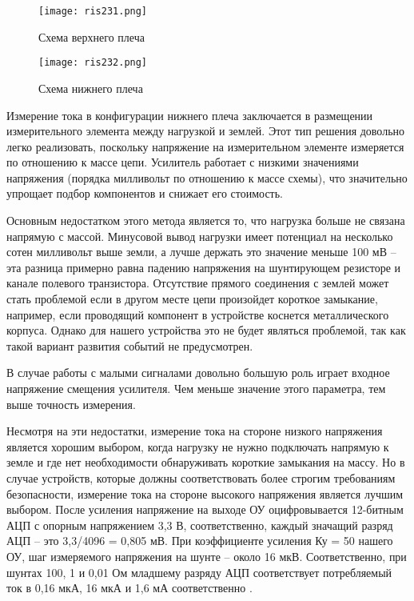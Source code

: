 \begin{figure}[H]
  \centering
  \texttt{[image: ris231.png]}
  \caption{Схема верхнего плеча}
  \label{ris:231}
\end{figure}

\begin{figure}[H]
  \centering
  \texttt{[image: ris232.png]}
  \caption{Схема нижнего плеча}
  \label{ris:232}
\end{figure}

Измерение тока в конфигурации нижнего плеча заключается в размещении измерительного 
элемента между нагрузкой и землей. Этот тип решения довольно легко реализовать, поскольку 
напряжение на измерительном элементе измеряется по отношению к массе цепи. Усилитель 
работает с низкими значениями напряжения (порядка милливольт по отношению к массе схемы), 
что значительно упрощает подбор компонентов и снижает его стоимость.

Основным недостатком этого метода является то, что нагрузка больше не связана напрямую с массой.
 Минусовой вывод нагрузки имеет потенциал на несколько сотен милливольт выше земли, 
 а лучше держать это значение меньше 100 мВ -- эта разница примерно равна падению напряжения
  на шунтирующем резисторе и канале полевого транзистора. Отсутствие прямого соединения
с землей может стать проблемой если в другом месте цепи произойдет короткое замыкание,
    например, если проводящий компонент в устройстве коснется металлического корпуса. 
    Однако для нашего устройства это не будет являться проблемой, так как такой вариант 
    развития событий не предусмотрен.

В случае работы с малыми сигналами довольно большую роль играет входное напряжение 
    смещения усилителя. Чем меньше значение этого параметра, тем выше точность измерения.

Несмотря на эти недостатки, измерение тока на стороне низкого напряжения является хорошим выбором,
 когда нагрузку не нужно подключать напрямую к земле и где нет необходимости обнаруживать 
 короткие замыкания на массу. Но в случае устройств, которые должны соответствовать 
 более строгим требованиям безопасности, измерение тока на стороне высокого 
 напряжения является лучшим выбором.
 После усиления напряжение на выходе ОУ оцифровывается 12-битным АЦП с опорным 
 напряжением 3,3 В, соответственно, каждый значащий разряд АЦП -- это 3,3/4096 = 0,805 мВ.
  При коэффициенте усиления Ку = 50 нашего ОУ, шаг измеряемого напряжения
   на шунте -- около 16 мкВ. Соответственно, при шунтах 100, 1 и 0,01 Ом младшему 
   разряду АЦП соответствует потребляемый ток в 0,16 мкА, 16 мкА и 1,6 мА соответственно 
   \cite{GooglePatent:1}.

